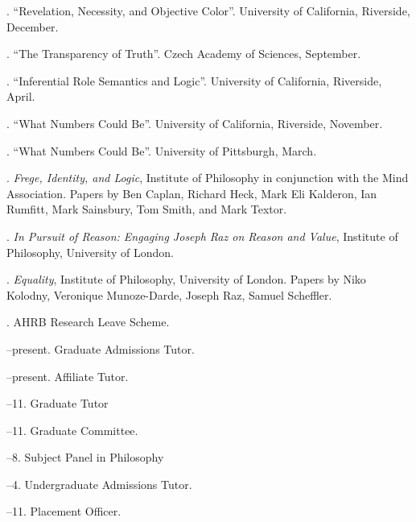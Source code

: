 \documentclass[11pt]{article}
\begin{document}
. ``Revelation, Necessity, and Objective Color''. University of California, Riverside, December.

. ``The Transparency of Truth''. Czech Academy of Sciences, September.

. ``Inferential Role Semantics and Logic''. University of California, Riverside, April.

. ``What Numbers Could Be''. University of California, Riverside, November.

. ``What Numbers Could Be''. University of Pittsburgh, March.



\bigskip

\medskip

. \emph{Frege, Identity, and Logic}, Institute of Philosophy in conjunction with the Mind Association. Papers by Ben Caplan, Richard Heck, Mark Eli Kalderon, Ian Rumfitt, Mark Sainsbury, Tom Smith, and Mark Textor.

. \emph{In Pursuit of Reason: Engaging Joseph Raz on Reason and Value}, Institute of Philosophy, University of London.

. \emph{Equality}, Institute of Philosophy, University of London. Papers by Niko Kolodny, Veronique Munoze-Darde, Joseph Raz, Samuel Scheffler.

\bigskip

\medskip
  
. AHRB Research Leave Scheme.

\bigskip 

\medskip

--present. Graduate Admissions Tutor.

--present. Affiliate Tutor.

--11. Graduate Tutor

--11. Graduate Committee.

--8. Subject Panel in Philosophy

--4. Undergraduate Admissions Tutor.

--11. Placement Officer.

\bigskip

\medskip
\end{document}
